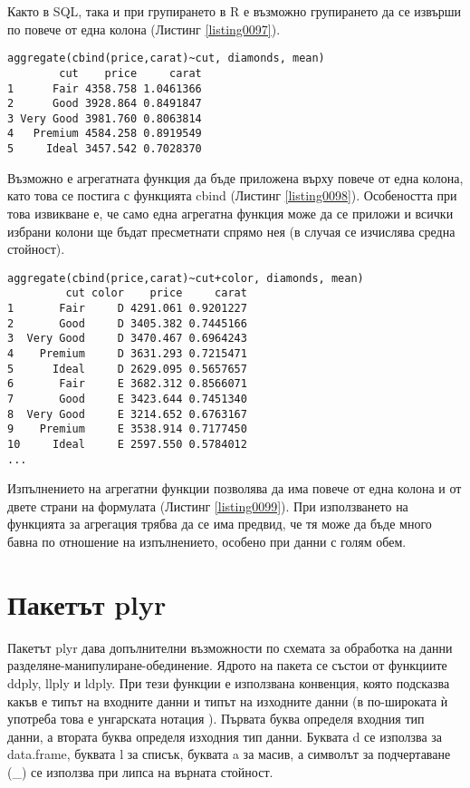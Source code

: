 Както в SQL, така и при групирането в R е възможно групирането да се извърши по повече от една колона (Листинг \ref{listing0097}).

\begin{lstlisting}[caption=Прилагане на агрегатна функция върху повече колони в едни и същи групи, label=listing0098]
aggregate(cbind(price,carat)~cut, diamonds, mean)
        cut    price     carat
1      Fair 4358.758 1.0461366
2      Good 3928.864 0.8491847
3 Very Good 3981.760 0.8063814
4   Premium 4584.258 0.8919549
5     Ideal 3457.542 0.7028370
\end{lstlisting}

Възможно е агрегатната функция да бъде приложена върху повече от една колона, като това се постига с функцията cbind (Листинг \ref{listing0098}). Особеността при това извикване е, че само една агрегатна функция може да се приложи и всички избрани колони ще бъдат пресметнати спрямо нея (в случая се изчислява средна стойност).

\begin{lstlisting}[caption=Използване на повече колони от двете страни на формулата, label=listing0099]
aggregate(cbind(price,carat)~cut+color, diamonds, mean)
         cut color    price     carat
1       Fair     D 4291.061 0.9201227
2       Good     D 3405.382 0.7445166
3  Very Good     D 3470.467 0.6964243
4    Premium     D 3631.293 0.7215471
5      Ideal     D 2629.095 0.5657657
6       Fair     E 3682.312 0.8566071
7       Good     E 3423.644 0.7451340
8  Very Good     E 3214.652 0.6763167
9    Premium     E 3538.914 0.7177450
10     Ideal     E 2597.550 0.5784012
...
\end{lstlisting}

Изпълнението на агрегатни функции позволява да има повече от една колона и от двете страни на формулата (Листинг \ref{listing0099}). При използването на функцията за агрегация трябва да се има предвид, че тя може да бъде много бавна по отношение на изпълнението, особено при данни с голям обем.

\section{Пакетът plyr}

Пакетът plyr дава допълнителни възможности по схемата за обработка на данни разделяне-манипулиране-обединение. Ядрото на пакета се състои от функциите ddply, llply и ldply. При тези функции е използвана конвенция, която подсказва какъв е типът на входните данни и типът на изходните данни (в по-широката ѝ употреба това е унгарската нотация \cite{hnot}). Първата буква определя входния тип данни, а втората буква определя изходния тип данни. Буквата d се използва за data.frame, буквата l за списък, буквата a за масив, а символът за подчертаване (\_) се използва при липса на върната стойност.


